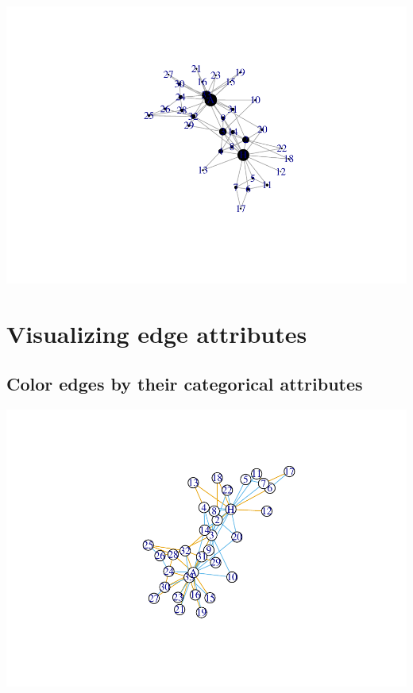 \documentclass[
]{book}
\newenvironment{Shaded}{\begin{snugshade}}{\end{snugshade}}
\newcommand{\AttributeTok}[1]{\textcolor[rgb]{0.13,0.29,0.53}{#1}}
\newcommand{\CommentTok}[1]{\textcolor[rgb]{0.56,0.35,0.01}{\textit{#1}}}
\newcommand{\FunctionTok}[1]{\textcolor[rgb]{0.13,0.29,0.53}{\textbf{#1}}}
\newcommand{\NormalTok}[1]{#1}
\newcommand{\SpecialCharTok}[1]{\textcolor[rgb]{0.81,0.36,0.00}{\textbf{#1}}}
\newcommand{\StringTok}[1]{\textcolor[rgb]{0.31,0.60,0.02}{#1}}
\begin{document}
\includegraphics{bookdown-demo_files/figure-latex/unnamed-chunk-183-1.pdf}

\section{Visualizing edge attributes}\label{visualizing-edge-attributes}

\subsection{Color edges by their categorical attributes}\label{color-edges-by-their-categorical-attributes}

\begin{Shaded}
\end{Shaded}

\includegraphics{bookdown-demo_files/figure-latex/unnamed-chunk-184-1.pdf}
\end{document}
